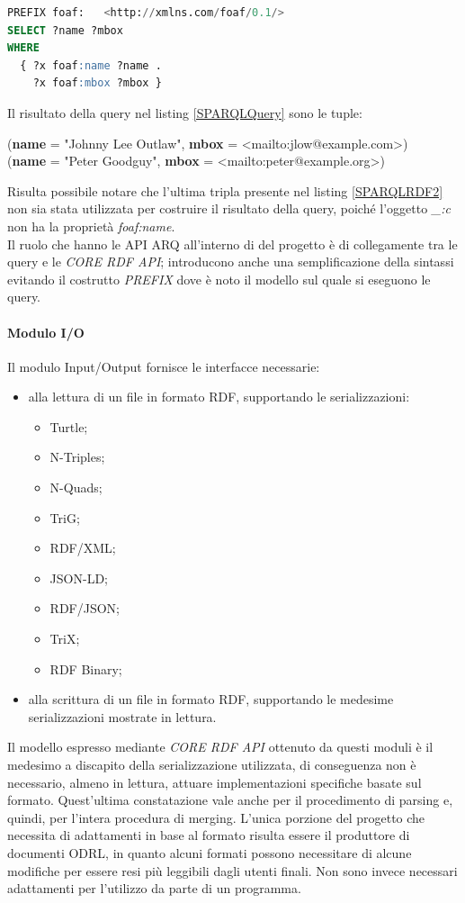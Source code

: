 \documentclass[12pt,a4paper,twoside]{book}
\begin{document}
\begin{lstlisting}[language=sql,firstnumber=1,caption={Query SPARQL per il recupero dei nomi e delle mail solo per soggetti che presentano entrambe le proprietà},captionpos=b,label=SPARQLQuery2]
PREFIX foaf:   <http://xmlns.com/foaf/0.1/>
SELECT ?name ?mbox
WHERE
  { ?x foaf:name ?name .
    ?x foaf:mbox ?mbox }
\end{lstlisting}\mbox{}
Il risultato della query nel listing \ref{SPARQLQuery} sono le tuple:
\begin{center}
(\textbf{name} = "Johnny Lee Outlaw", \textbf{mbox} = <mailto:jlow@example.com>)\\
(\textbf{name} = "Peter Goodguy",	\textbf{mbox} = <mailto:peter@example.org>)
\end{center}
Risulta possibile notare che l'ultima tripla presente nel listing \ref{SPARQLRDF2} non sia stata utilizzata per costruire il risultato della query, poiché l'oggetto \textit{\_:c} non ha la proprietà \textit{foaf:name}.\\
Il ruolo che hanno le API ARQ all'interno di del progetto è di collegamente tra le query e le \textit{CORE RDF API}; introducono anche una semplificazione della sintassi evitando il costrutto \textit{PREFIX} dove è noto il modello sul quale si eseguono le query.
\newpage
\paragraph{Modulo I/O}\mbox{}
Il modulo Input/Output fornisce le interfacce necessarie:
\begin{itemize}
\item alla lettura di un file in formato RDF, supportando le serializzazioni:
\begin{itemize}
\item Turtle;
\item N-Triples;
\item N-Quads;
\item TriG;
\item RDF/XML;
\item JSON-LD;
\item RDF/JSON;
\item TriX;
\item RDF Binary;
\end{itemize}
\item alla scrittura di un file in formato RDF, supportando le medesime serializzazioni mostrate in lettura.
\end{itemize}
Il modello espresso mediante \textit{CORE RDF API} ottenuto da questi moduli è il medesimo a discapito della serializzazione utilizzata, di conseguenza non è necessario, almeno in lettura, attuare implementazioni specifiche basate sul formato. Quest'ultima constatazione vale anche per il procedimento di parsing e, quindi, per l'intera procedura di merging. L'unica porzione del progetto che necessita di adattamenti in base al formato risulta essere il produttore di documenti ODRL, in quanto alcuni formati possono necessitare di alcune modifiche per essere resi più leggibili dagli utenti finali. Non sono invece necessari adattamenti per l'utilizzo da parte di un programma.
\end{document}
